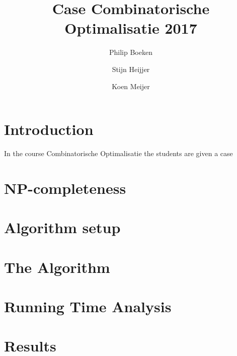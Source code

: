 \documentclass[a4paper]{article}
\title{Case Combinatorische Optimalisatie 2017}
\author{Philip Boeken \and Stijn Heijjer \and Koen Meijer}
\begin{document}
\maketitle
\section{Introduction}
In the course Combinatorische Optimalisatie the students are given a case 

\section{NP-completeness}

\section{Algorithm setup}

\section{The Algorithm}

\section{Running Time Analysis}

\section{Results}
\end{document}
